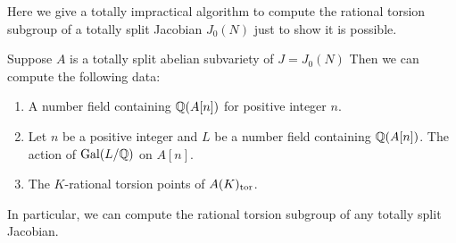 \documentclass[11pt, proquest]{uwthesis}
\begin{document}
Here we give a totally impractical algorithm to compute the rational torsion
subgroup of a totally split Jacobian $J_0(N)$ just to show it is possible.
\begin{proposition}
    Suppose $A$ is a totally split abelian subvariety of $J=J_0(N)$ Then we can
    compute the following data:
    \begin{enumerate}
        \item
            A number field containing $\mathbb{Q}(A[n])$ for positive integer $n$.
        \item
            Let $n$ be a positive integer and $L$ be a number field containing
            $\mathbb{Q}(A[n])$. The action of $\operatorname{Gal}(L/\mathbb{Q})$ on $A[n]$.
        \item 
            The $K$-rational torsion points of $A(K)_{\mathrm{tor}}$.
    \end{enumerate}
    In particular, we can compute the rational torsion subgroup of any totally
    split Jacobian.
\end{proposition}
\end{document}
